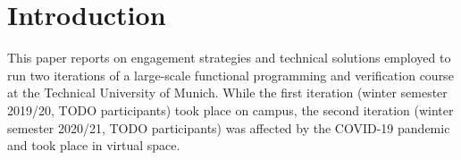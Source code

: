 \section{Introduction}

This paper reports on engagement strategies
and technical solutions employed to
run two iterations of a large-scale functional programming and verification course at the Technical University of Munich.
While the first iteration (winter semester 2019/20, TODO participants)
took place on campus,
the second iteration (winter semester 2020/21, TODO participants) was affected by the COVID-19 pandemic and took place in virtual space.




